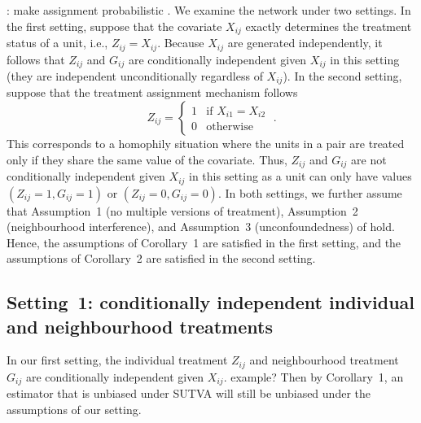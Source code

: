\documentclass[10pt]{article}
\begin{document}
\todo: make assignment probabilistic \parencite{Imbens:2015}. We examine the network under two settings. In the first setting, suppose that the covariate $X_{ij}$ exactly determines the treatment status of a unit, i.e., $Z_{ij} = X_{ij}$. Because $X_{ij}$ are generated independently, it follows that $Z_{ij}$ and $G_{ij}$ are conditionally independent given $X_{ij}$ in this setting (they are independent unconditionally regardless of $X_{ij}$). In the second setting, suppose that the treatment assignment mechanism follows
\[
Z_{ij} = \begin{cases} 1 & \text{if } X_{i1} = X_{i2} \\ 0 & \text{otherwise} \end{cases} \;.
\]
This corresponds to a homophily situation where the units in a pair are treated only if they share the same value of the covariate. Thus, $Z_{ij}$ and $G_{ij}$ are not conditionally independent given $X_{ij}$ in this setting as a unit can only have values $(Z_{ij}=1,G_{ij}=1)$ or $(Z_{ij}=0,G_{ij}=0)$. In both settings, we further assume that Assumption~1 (no multiple versions of treatment), Assumption~2 (neighbourhood interference), and Assumption~3 (unconfoundedness) of \textcite{Forastiere:2021} hold. Hence, the assumptions of Corollary~1 are satisfied in the first setting, and the assumptions of Corollary~2 are satisfied in the second setting.

\subsection{Setting~1: conditionally independent individual and neighbourhood treatments}

In our first setting, the individual treatment $Z_{ij}$ and neighbourhood treatment $G_{ij}$ are conditionally independent given $X_{ij}$. \todo example? Then by Corollary~1, an estimator that is unbiased under SUTVA will still be unbiased under the assumptions of our setting.
\\
\end{document}
